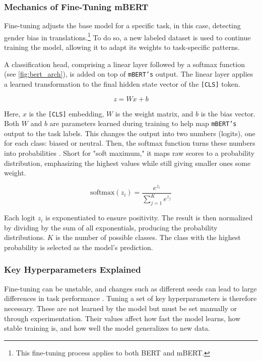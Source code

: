 \subsubsection{Mechanics of Fine-Tuning mBERT}
    Fine-tuning adjusts the base model for a specific task, in this case, detecting gender bias in translations.\footnote{This fine-tuning process applies to both BERT and mBERT.} To do so, a new labeled dataset is used to continue training the model, allowing it to adapt its weights to task-specific patterns. 

    A classification head, comprising a linear layer followed by a softmax function (see \autoref{fig:bert_arch}), is added on top of \texttt{mBERT’s} output. The linear layer applies a learned transformation to the final hidden state vector of the \texttt{[CLS]} token. 

    \[
    z = Wx + b
    \]

    Here, \(x\) is the \texttt{[CLS]} embedding, \(W\) is the weight matrix, and \(b\) is the bias vector. Both \(W\) and \(b\) are parameters learned during training to help map \texttt{mBERT’s} output to the task labels. This changes the output into two numbers (logits), one for each class: biased or neutral. Then, the softmax function turns these numbers into probabilities \parencite{devlinBERTPretrainingDeep2019,xiaoIntroductionTransformersNLP2023}. Short for "soft maximum," it maps raw scores to a probability distribution, emphasizing the highest values while still giving smaller ones some weight.

    \[
    \text{softmax}(z_i) = \frac{e^{z_i}}{\sum_{j=1}^{K} e^{z_j}}
    \]

    Each logit \( z_i \) is exponentiated to ensure positivity. The result is then normalized by dividing by the sum of all exponentials, producing the probability distributions. \( K \) is the number of possible classes. The class with the highest probability is selected as the model’s prediction.
    
\subsubsection{Key Hyperparameters Explained} \label{subsection:hyperparameters_explained}
    Fine-tuning can be unstable, and changes such as different seeds can lead to large differences in task performance \parencite{mosbachStabilityFinetuningBERT2021}. Tuning a set of key hyperparameters is therefore necessary. These are not learned by the model but must be set manually or through experimentation. Their values affect how fast the model learns, how stable training is, and how well the model generalizes to new data.

